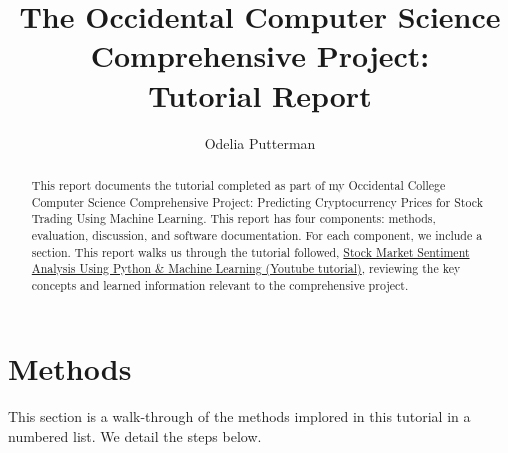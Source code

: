 \documentclass[10pt,twocolumn]{article}
\title{The Occidental Computer Science Comprehensive Project: \\ Tutorial Report}
\author{Odelia Putterman}
\affiliation{Occidental College}
\begin{document}
\maketitle

\begin{abstract}
    This report documents the tutorial completed as part of my Occidental College Computer Science Comprehensive Project: Predicting Cryptocurrency Prices for Stock Trading Using Machine Learning. This report has four components: methods, evaluation, discussion, and software documentation. For each component, we include a section. This report walks us through the tutorial followed, \href{https://www.youtube.com/watch?v=4OlvGGAsj8I}{Stock Market Sentiment Analysis Using Python \& Machine Learning (Youtube tutorial)}, reviewing the key concepts and learned information relevant to the comprehensive project.
\end{abstract}

\section{Methods}

This section is a walk-through of the methods implored in this tutorial in a numbered list. We detail the steps below.
\end{document}
